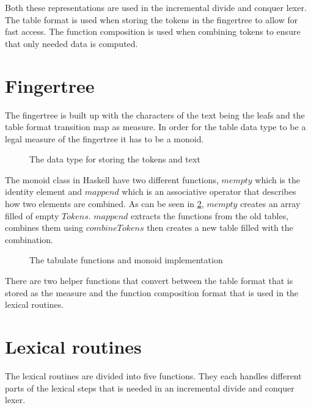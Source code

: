 Both these representations are used in the incremental divide and conquer lexer.
The table format is used when storing the tokens in the fingertree to allow for
fast access. The function composition is used when combining tokens to ensure
that only needed data is computed.

\section{Fingertree}
The fingertree is built up with the characters of the text being the leafs
and the table format transition map as measure. In order for the table data type
to be a legal measure of the fingertree it has to be a monoid.

\begin{figure}[h!]
  
  \caption{The data type for storing the tokens and text \label{fig:fingertreedt}}
\end{figure}

The monoid class in Haskell have two different functions, $mempty$ which is the
identity element and $mappend$ which is an associative operator that describes
how two elements are combined. As can be seen in \cref{fig:tablemonoid},
$mempty$ creates an array filled of empty $Tokens$. $mappend$ extracts the
functions from the old tables, combines them using $combineTokens$ then creates
a new table filled with the combination.

\begin{figure}[h!]
  
  \caption{The tabulate functions and monoid implementation \label{fig:tablemonoid}}
\end{figure}

There are two helper functions that convert between the table format that is
stored as the measure and the function composition format that is used in the
lexical routines.

\section{Lexical routines}
The lexical routines are divided into five functions. They each handles
different parts of the lexical steps that is needed in an incremental divide and
conquer lexer.

